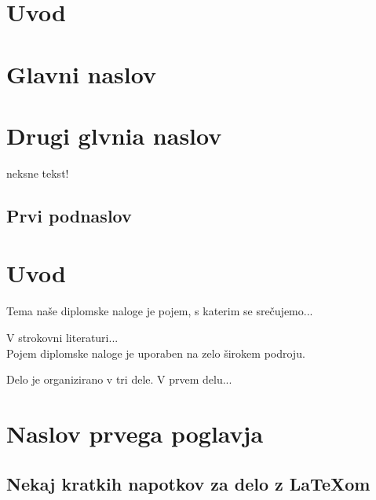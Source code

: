 
\chapter*{Uvod}



\chapter{Glavni naslov}

\chapter{Drugi glvnia naslov}
\label{chap:2.naslov}

neksne tekst!


\section{Prvi podnaslov}
\label{sec:1.podnaslov}


\chapter*{Uvod}


Tema na\v se diplomske naloge je pojem, s katerim se sre\v cujemo...

V strokovni literaturi...\\

Pojem diplomske naloge je uporaben na zelo \v sirokem podroju.

Delo je organizirano v tri dele. V prvem delu...


\chapter{Naslov prvega poglavja}

\section[Naslov drugega razdelka]{Nekaj kratkih napotkov za delo z \LaTeX om}



